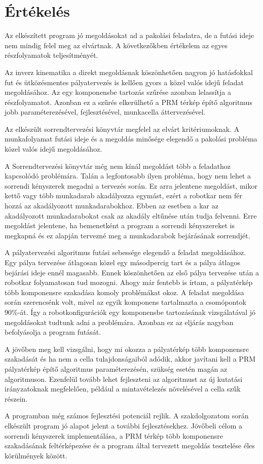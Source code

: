 \chapter{Értékelés}

Az elkészített program jó megoldásokat ad a pakolási feladatra, de a futási ideje nem mindig felel meg az elvártnak. A következőkben értékelem az egyes részfolyamatok teljesítményét.

Az inverz kinematika a direkt megoldásnak köszönhetően nagyon jó hatásfokkal fut és ütközésmentes pályatervezés is kellően gyors a közel valós idejű feladat megoldásához. Az egy komponensbe tartozás szűrése azonban lelassítja a részfolyamatot. Azonban ez a szűrés elkerülhető a PRM térkép építő algoritmus jobb paraméterezésével, fejlesztésével, munkacella áttervezésével.  


Az elkészült sorrendtervezési könyvtár megfelel az elvárt kritériumoknak. A munkafolyamat futási ideje és a megoldás minősége elegendő a pakolási probléma közel valós idejű megoldásához. 

A Sorrendtervezési könyvtár még nem kínál megoldást több a feladathoz kapcsolódó problémára. Talán a legfontosabb ilyen probléma, hogy nem lehet a sorrendi kényszerek megadni a tervezés során. Ez arra jelentene megoldást, mikor kettő vagy több munkadarab akadályozza egymást, ezért a robotkar nem fér hozzá az akadályozott munkadarabokhoz. Ebben az esetben a kar az akadályozott munkadarabokat csak az akadály eltűnése után tudja felvenni. Erre megoldást jelentene, ha bemenetként a program a sorrendi kényszereket is megkapná és ez alapján tervezné meg a munkadarabok bejárásának sorrendjét.

A pályatervezési algoritmus futási sebessége elegendő a feladat megoldásához. Egy pálya tervezése átlagosan közel egy másodpercig tart és a pálya átlagos bejárási ideje ennél magasabb. Ennek köszönhetően az első pálya tervezése után a robotkar folyamatosan tud mozogni. Ahogy már fentebb is írtam, a pályatérkép több komponensre szakadása komoly problémákat okoz. A feladat megoldása során szerencsénk volt, mivel az egyik komponens tartalmazta a csomópontok 90\%-át. Így a robotkonfigurációk egy komponensbe tartozásának vizsgálatával jó megoldásokat tudtunk adni a problémára. Azonban ez az eljárás nagyban befolyásolja a program futását.

A jövőben meg kell vizsgálni, hogy mi okozza a pályatérkép több komponensre szakadását és ha nem a cella tulajdonságaiból adódik, akkor javítani kell a PRM pályatérkép építő algoritmus paraméterezésén, szükség esetén magán az algoritmuson. Ezenfelül tovább lehet fejleszteni az algoritmust az új kutatási irányzatoknak megfelelően, például a mintavételezés növelésével a cella szűk részein.

A programban még számos fejlesztési potenciál rejlik. A szakdolgozatom során elkészült program jó alapot jelent a további fejlesztésekhez. Jövőbeli célom a sorrendi kényszerek implementálása, a PRM térkép több komponensre szakadásának feltérképezése és a program által tervezett megoldás tesztelése éles körülmények között.
